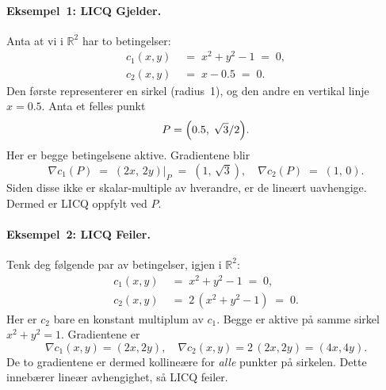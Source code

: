 \paragraph{Eksempel~1: LICQ Gjelder.}

Anta at vi i \(\mathbb{R}^2\) har to betingelser:
\[
	\begin{aligned}
		c_1(x,y)\; & =\; x^2 + y^2 - 1\;=\;0, \\
		c_2(x,y)\; & =\; x - 0.5\;=\;0.
	\end{aligned}
\]
Den første representerer en sirkel (radius~1), og den andre en vertikal linje \(x=0.5\). Anta et felles punkt
\[
	P = \Bigl(0.5,\;\sqrt{3}/2\Bigr).
\]
Her er begge betingelsene aktive. Gradientene blir
\[
	\nabla c_1(P)\;=\;(2x,\,2y)\big\vert_{P}\;=\;(1,\,\sqrt{3}),
	\quad
	\nabla c_2(P)\;=\;(1,\,0).
\]
Siden disse ikke er skalar-multiple av hverandre, er de lineært uavhengige. Dermed er LICQ oppfylt ved \(P\).


\paragraph{Eksempel~2: LICQ Feiler.}

Tenk deg følgende par av betingelser, igjen i \(\mathbb{R}^2\):
\[
	\begin{aligned}
		c_1(x,y)\; & =\;x^2 + y^2 - 1\;=\;0,      \\
		c_2(x,y)\; & =\;2\,(x^2 + y^2 - 1)\;=\;0.
	\end{aligned}
\]
Her er \(c_2\) bare en konstant multiplum av \(c_1\). Begge er aktive på samme sirkel \(x^2+y^2=1\). Gradientene er
\[
	\nabla c_1(x,y)=(2x,2y),\quad
	\nabla c_2(x,y)=2\,(2x,2y)=(4x,4y).
\]
De to gradientene er dermed kollineære for \emph{alle} punkter på sirkelen. Dette innebærer lineær avhengighet, så LICQ feiler.

